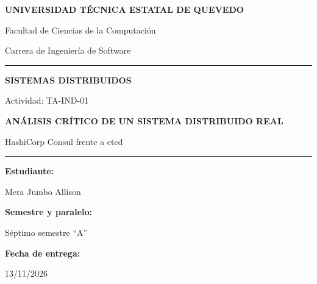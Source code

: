 \documentclass[12pt,a4paper]{article}
\begin{document}

\begin{titlepage}
    \begin{center}

        \vspace*{0.8cm}
        {\Large\bfseries
        UNIVERSIDAD TÉCNICA ESTATAL DE QUEVEDO\par}
        \vspace{0.4cm}
        {\large
        Facultad de Ciencias de la Computación\par}
        \vspace{0.2cm}
        {\large
        Carrera de Ingeniería de Software\par}
        \vspace{0.8cm}
        \rule{0.85\textwidth}{0.6pt}
        \vspace{1cm}
        {\large\bfseries
        SISTEMAS DISTRIBUIDOS\par}
        \vspace{0.3cm}
        {\normalsize
        Actividad: TA-IND-01\par}
        \vspace{1.2cm}
        {\LARGE\bfseries
        ANÁLISIS CRÍTICO DE UN SISTEMA
        DISTRIBUIDO REAL\par}
        \vspace{0.4cm}
        {\Large
        HashiCorp Consul frente a etcd\par}
        \vspace{0.8cm}
        \rule{0.85\textwidth}{0.6pt}
        \vspace{1.2cm}
        {\large\bfseries Estudiante:\par}
        \vspace{0.15cm}
        {\large Mera Jumbo Allison\par}
        \vspace{0.6cm}
        {\large\bfseries Semestre y paralelo:\par}
        \vspace{0.15cm}
        {\large Séptimo semestre ``A''\par}
        \vspace{0.6cm}
        {\large\bfseries Fecha de entrega:\par}
        \vspace{0.15cm}
        {\large 13/11/2026\par}

\end{center}
\end{titlepage}
\end{document}
